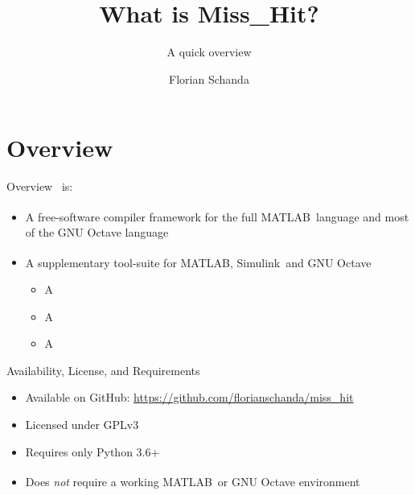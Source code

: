 \documentclass{beamer}
\author{Florian Schanda}
\title{What is {\sc Miss\_Hit}?}
\subtitle{A quick overview}
\newcommand{\mh}[0]{{\sc\structure{Miss\_Hit}}}
\newcommand{\matlab}[0]{MATLAB\textsuperscript{\tiny\textregistered}}
\newcommand{\simulink}[0]{Simulink\textsuperscript{\tiny\textregistered}}
\begin{document}
\maketitle

{}

\section{Overview}
\begin{frame}{Overview}
  \mh~is:
  \begin{itemize}
  \item A free-software compiler framework for the full \matlab\
    language and most of the GNU Octave language \pause
  \item A supplementary tool-suite for \matlab, \simulink\ and GNU
    Octave
    \begin{itemize}
    \item A 
    \item A 
    \item A 
    \end{itemize}
  \end{itemize}
\end{frame}

\begin{frame}{Availability, License, and Requirements}
  \begin{itemize}
  \item Available on GitHub: \url{https://github.com/florianschanda/miss_hit}
  \item Licensed under GPLv3
    \pause
  \item Requires only Python 3.6+
  \item Does \emph{not} require a working \matlab\ or GNU Octave
    environment
  \end{itemize}
\end{frame}
\end{document}
